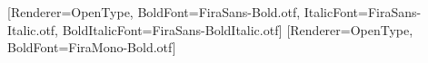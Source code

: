 \setmainfont{FiraSans-Regular.otf}[Renderer=OpenType, BoldFont=FiraSans-Bold.otf, ItalicFont=FiraSans-Italic.otf, BoldItalicFont=FiraSans-BoldItalic.otf]
\setmonofont{FiraMono-Regular.otf}[Renderer=OpenType, BoldFont=FiraMono-Bold.otf]

\usepackage{amssymb}
\usepackage{pifont}
\newfontface{}
\usepackage{newunicodechar}
